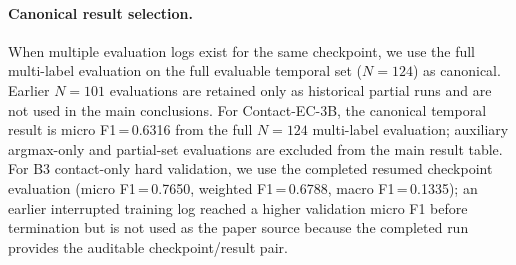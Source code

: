 \documentclass[11pt,a4paper]{article}
\begin{document}
\paragraph{Canonical result selection.}
When multiple evaluation logs exist for the same checkpoint, we use the full
multi-label evaluation on the full evaluable temporal set ($N=124$) as canonical.
Earlier $N=101$ evaluations are retained only as historical partial runs and are
not used in the main conclusions. For Contact-EC-3B, the canonical temporal result
is micro F1\,=\,0.6316 from the full $N=124$ multi-label evaluation; auxiliary
argmax-only and partial-set evaluations are excluded from the main result table.
For B3 contact-only hard validation, we use the completed resumed checkpoint
evaluation (micro F1\,=\,0.7650, weighted F1\,=\,0.6788, macro F1\,=\,0.1335);
an earlier interrupted training log reached a higher validation micro F1 before
termination but is not used as the paper source because the completed run provides
the auditable checkpoint/result pair.



\end{document}

